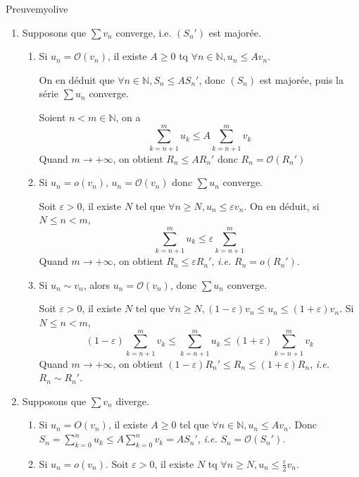     \begin{demo}{Preuve}{myolive}
        \begin{enumerate}
            \item Supposons que $\sum v_n$ converge, i.e. $(S_n')$ est majorée. \begin{enumerate}[label=(\alph*)]
                \item Si $u_n = \mathcal{O}(v_n)$, il existe $A \geq 0$ tq $\forall n \in \mathbb{N}, u_n \leq A v_n$. 
                
                On en déduit que $\forall n \in \mathbb{N}, S_n \leq A S_n'$, donc $(S_n)$ est majorée, puis la série $\sum u_n$ converge. 

                Soient $n < m \in \mathbb{N}$, on a 
                    \[ \sum_{k=n+1}^m u_k \leq A \sum_{k=n+1}^{m} v_k \]
                Quand $m \rightarrow +\infty$, on obtient $R_n \leq A R_n'$ donc $R_n = \mathcal{O}(R_n')$
                \item Si $u_n = o(v_n)$, $u_n = \mathcal{O}(v_n)$ donc $\sum u_n$ converge.
                
                Soit $\varepsilon > 0$, il existe $N$ tel que $\forall n \geq N, u_n \leq \varepsilon v_n$. On en déduit, si $N \leq n < m$,
                \[ \sum_{k=n+1}^{m} u_k \leq \varepsilon \sum_{k=n+1}^{m} \] 
                Quand $m \rightarrow +\infty$, on obtient $R_n \leq \varepsilon R_n'$, \textit{i.e.} $R_n = o(R_n')$.
                \item Si $u_n \sim v_n$, alors $u_n = \mathcal{O}(v_n)$, donc $\sum u_n$ converge. 
                
                Soit $\varepsilon > 0$, il existe $N$ tel que $\forall n \geq N, (1-\varepsilon)v_n \leq u_n \leq (1 + \varepsilon)v_n$. Si $N \leq n < m$, 
                \[ (1-\varepsilon)\sum_{k=n+1}^{m}v_k \leq \sum_{k=n+1}^{m}u_k \leq (1+\varepsilon)\sum_{k=n+1}^{m}v_k \] 
                Quand $m \rightarrow +\infty$, on obtient $(1-\varepsilon)R_n' \leq R_n \leq (1+\varepsilon)R_n$, \textit{i.e.} $R_n \sim R_n'$.
            \end{enumerate}
            \item Supposons que $\sum v_n$ diverge. \begin{enumerate}[label=(\alph*)]
                \item Si $u_n = O(v_n)$, il existe $A \geq 0$ tel que $\forall n \in \mathbb{N}, u_n \leq A v_n$. Donc $S_n = \sum_{k=0}^{n}u_k \leq A \sum_{k=0}^{n}v_k = A S_n'$, \textit{i.e.} $S_n = \mathcal{O}(S_n')$.
                \item Si $u_n = o(v_n)$. Soit $\varepsilon > 0$, il existe $N$ tq $\forall n \geq N, u_n \leq \frac{\varepsilon}{2} v_n$. 
                

\end{enumerate}
\end{enumerate}
\end{demo}

